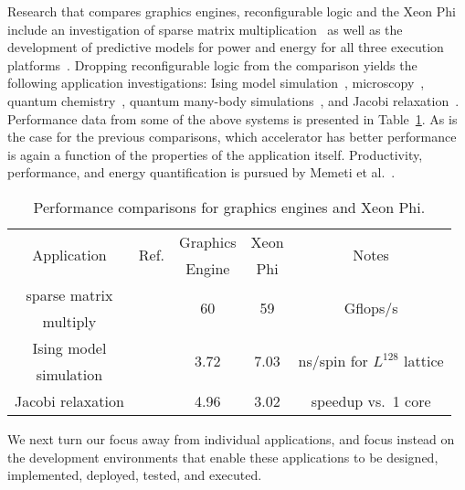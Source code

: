 Research that compares graphics engines, reconfigurable logic and
the Xeon Phi include an investigation of
sparse matrix multiplication~\cite{gsbh16} as well as the development of
predictive models for power and energy for all three
execution platforms~\cite{opr+17}.
Dropping reconfigurable logic from the comparison yields the following
application investigations:
Ising model simulation~\cite{ws13},
microscopy~\cite{tkk+14},
quantum chemistry~\cite{lrg14},
quantum many-body simulations~\cite{Lyakh15}, and
Jacobi relaxation~\cite{cv16}.
Performance data from some of the above systems is presented in
Table~\ref{tbl:compare3}.
As is the case for the previous comparisons, which accelerator has better
performance is again a function of the properties of the application itself.
Productivity, performance, and energy quantification is pursued
by Memeti et al.~\cite{mlp+17}.

\begin{table}[ht]
\centering
\caption{Performance comparisons for graphics engines and Xeon Phi.}
\label{tbl:compare3}
\vspace{0.1in} 
\begin{tabular}{c | c | c | c | c }
\multirow{2}{*}{Application} & \multirow{2}{*}{Ref.} & Graphics & Xeon & \multirow{2}{*}{Notes} \\
  &   & Engine & Phi &  \\ \hline
sparse matrix& \multirow{2}{*}{\cite{gsbh16}} & \multirow{2}{*}{60} & \multirow{2}{*}{59} & \multirow{2}{*}{Gflops/s}\\
multiply  & & & \\ \hline
Ising model & \multirow{2}{*}{\cite{ws13}} & \multirow{2}{*}{3.72} & \multirow{2}{*}{7.03} & \multirow{2}{*}{ns/spin for $L^{128}$ lattice}\\
simulation  & & & \\ \hline
Jacobi relaxation  & \cite{cv16} & 4.96 & 3.02 & speedup vs.~1 core\\
\end{tabular}
\end{table}

We next turn our focus away from individual applications, and focus
instead on the development environments that enable these applications
to be designed, implemented, deployed, tested, and executed.
